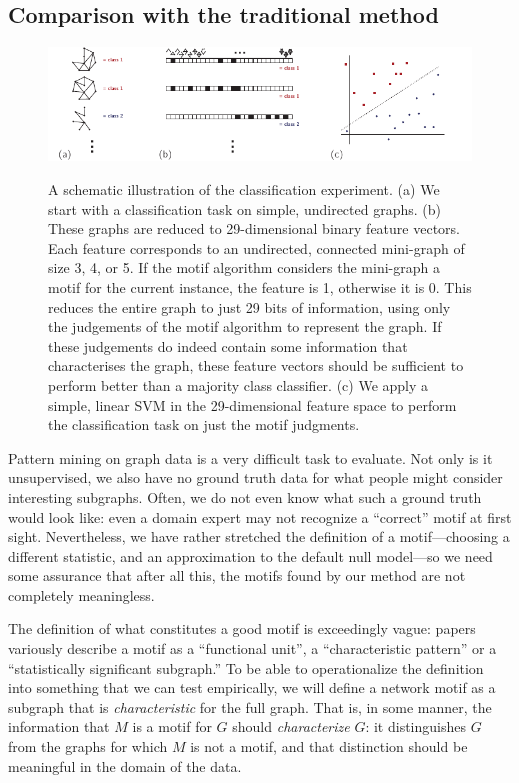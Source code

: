 \documentclass[twoside,11pt]{article}
\begin{document}
\subsection{Comparison with the traditional method}

\label{section:classification}

\begin{figure}[tbh]
{
  \includegraphics[width=\textwidth]{./images/experimentexplanation.pdf}	
}

  \caption{A schematic illustration of the classification experiment. (a) We start with a classification task on simple, undirected graphs. (b) These graphs are reduced to 29-dimensional binary feature vectors. Each feature corresponds to an undirected, connected mini-graph of size 3, 4, or 5. If the motif algorithm considers the mini-graph a motif for the current instance, the feature is 1, otherwise it is 0. This reduces the entire graph to just 29 bits of information, using only the judgements of the motif algorithm to represent the graph. If these judgements do indeed contain some information that characterises the graph, these feature vectors should be sufficient to perform better than a majority class classifier. (c) We apply a simple, linear SVM in the 29-dimensional feature space to perform the classification task on just the motif judgments.}
  \label{figure:experiment-explanation}
\end{figure}

Pattern mining on graph data is a very difficult task to evaluate. Not only is it unsupervised, we also have no ground truth data for what people might consider interesting subgraphs. Often, we do not even know what such a ground truth would look like: even a domain expert may not recognize a ``correct'' motif at first sight. Nevertheless, we have rather stretched the definition of a motif---choosing a different statistic, and an approximation to the default null model---so we need some assurance that after all this, the motifs found by our method are not completely meaningless.

The definition of what constitutes a good motif is exceedingly vague: papers variously describe a motif as a ``functional unit'', a ``characteristic pattern'' or a ``statistically significant subgraph.'' To be able to operationalize the definition into something that we can test empirically, we will define a network motif as a subgraph that is \emph{characteristic} for the full graph. That is, in some manner, the information that $M$ is a motif for $G$ should \emph{characterize} $G$: it distinguishes $G$ from the graphs for which $M$ is not a motif, and that distinction should be meaningful in the domain of the data.
\end{document}
